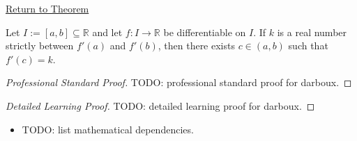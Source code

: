 \newpage
{}
\label{prf:darboux}

\begin{remark*}[Return]
\hyperref[thm:darboux]{Return to Theorem}
\end{remark*}

\begin{theorem*}
Let $I := [a,b] \subseteq \mathbb{R}$ and let $f : I \to \mathbb{R}$ be differentiable on $I$. If $k$ is a real number strictly between $f'(a)$ and $f'(b)$, then there exists $c \in (a,b)$ such that $f'(c) = k$.
\end{theorem*}

\begin{proof}[Professional Standard Proof]
\LRAProofBodyStart
TODO: professional standard proof for darboux.
\end{proof}

\begin{proof}[Detailed Learning Proof]
\LRAProofBodyStart
TODO: detailed learning proof for darboux.
\end{proof}

\begin{remark*}
\end{remark*}

\begin{dependencies}
\begin{itemize}
  \item TODO: list mathematical dependencies.
\end{itemize}
\end{dependencies}

\clearpage
